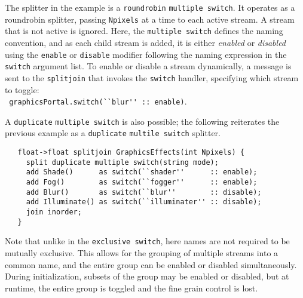 \documentclass{tr}
\begin{document}
The splitter in the  example is a \texttt{roundrobin} \texttt{multiple
switch}.  It operates as a roundrobin splitter, passing \verb+Npixels+
at  a time to  each active  stream. A  stream that  is not  active is
ignored.  Here,  the   \texttt{multiple  switch}  defines  the  naming
convention,  and as  each child  stream is  added, it  is  either {\it
enabled} or  {\it disabled} using the  \verb+enable+ or \verb+disable+
modifier  following  the  naming  expression  in  the  \texttt{switch}
argument list. To enable or disable a stream dynamically, a message is
sent to the \verb+splitjoin+ that invokes the \texttt{switch} handler,
specifying          which         stream          to         toggle:\\
\verb+ graphicsPortal.switch(``blur'' :: enable)+.

A  \texttt{duplicate} \texttt{multiple switch}  is also  possible; the
following  reiterates  the previous  example  as a  \texttt{duplicate}
\texttt{multile switch} splitter.
\begin{verbatim}
   float->float splitjoin GraphicsEffects(int Npixels) {
     split duplicate multiple switch(string mode);
     add Shade()      as switch(``shader''      :: enable);
     add Fog()        as switch(``fogger''      :: enable);
     add Blur()       as switch(``blur''        :: disable);
     add Illuminate() as switch(``illuminater'' :: disable);
     join inorder;
   }
\end{verbatim}

Note that unlike in the  \texttt{exclusive switch}, here names are not
required to  be mutually  exclusive. This allows  for the  grouping of
multiple  streams into  a common  name, and  the entire  group  can be
enabled or disabled  simultaneously. During initialization, subsets of
the group may be enabled or disabled, but at runtime, the entire group
is toggled and the fine grain control is lost.


\end{document}
